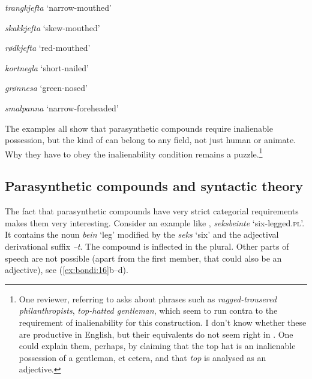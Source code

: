 \documentclass[output=paper]{LSP/langsci}
\begin{document}
\textit{trangkjefta} ‘narrow-mouthed’

\textit{skakkjefta} ‘skew-mouthed’ 

\textit{rødkjefta} ‘red-mouthed’
\z

\largerpage
\ea%
    \label{ex:bondi:15}
   
\textit{kortnegla} ‘short-nailed’

\textit{grønnesa} ‘green-nosed’

\textit{smalpanna} ‘narrow-foreheaded’
\z

The examples all show that parasynthetic compounds require inalienable possession, but the kind of  can belong to any  field, not just human or animate. Why they have to obey the inalienability condition remains a puzzle.\footnote{One reviewer, referring to \citet{Myler2014} asks about phrases such as \textit{ragged-trousered philanthropists}, \textit{top-hatted gentleman}, which seem to run contra to the requirement of inalienability for this construction. I don’t know whether these are productive in English, but their equivalents do not seem right in . One could explain them, perhaps, by claiming that the top hat is an inalienable possession of a gentleman, et cetera, and that \textit{top} is analysed as an adjective.} 

\subsection{Parasynthetic compounds and syntactic theory}

The fact that parasynthetic compounds have very strict categorial requirements makes them very interesting. Consider an example like ,  \textit{seksbeinte} ‘six-legged.\textsc{pl}’. It contains the noun \textit{bein} ‘leg’ modified by the  \textit{seks} ‘six’ and the adjectival derivational suffix \textit{–t}. The compound is inflected in the plural. Other parts of speech are not possible (apart from the first member, that could also be an adjective), see (\ref{ex:bondi:16}b–d).  

\ea%
    \label{ex:bondi:16}

\z
\z
\end{document}
